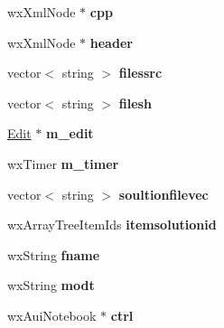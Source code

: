 \begin{DoxyCompactItemize}
\item 
\hypertarget{class_my_frame_a55fdc62db9cfaed55c9318a49a7e6d00}{wx\+Xml\+Node $\ast$ {\bfseries cpp}}\label{class_my_frame_a55fdc62db9cfaed55c9318a49a7e6d00}

\item 
\hypertarget{class_my_frame_a29d0500f3ac56fefc8754eb0f9655493}{wx\+Xml\+Node $\ast$ {\bfseries header}}\label{class_my_frame_a29d0500f3ac56fefc8754eb0f9655493}

\item 
\hypertarget{class_my_frame_a8219bad5739991ed403ad91e8e39b6da}{vector$<$ string $>$ {\bfseries filessrc}}\label{class_my_frame_a8219bad5739991ed403ad91e8e39b6da}

\item 
\hypertarget{class_my_frame_abe51d41c3d84769d73b644614e8b6dda}{vector$<$ string $>$ {\bfseries filesh}}\label{class_my_frame_abe51d41c3d84769d73b644614e8b6dda}

\item 
\hypertarget{class_my_frame_aad2347baa5785992e29c71072f7a4830}{\hyperlink{class_edit}{Edit} $\ast$ {\bfseries m\+\_\+edit}}\label{class_my_frame_aad2347baa5785992e29c71072f7a4830}

\item 
\hypertarget{class_my_frame_a487ae8aac4b7d05d5c943c3c2786b3c6}{wx\+Timer {\bfseries m\+\_\+timer}}\label{class_my_frame_a487ae8aac4b7d05d5c943c3c2786b3c6}

\item 
\hypertarget{class_my_frame_a0dd1da5220fb2ccde7c6e899a9ac9dce}{vector$<$ string $>$ {\bfseries soultionfilevec}}\label{class_my_frame_a0dd1da5220fb2ccde7c6e899a9ac9dce}

\item 
\hypertarget{class_my_frame_a5fabef1e36aeeff63246329a6f3a28c1}{wx\+Array\+Tree\+Item\+Ids {\bfseries itemsolutionid}}\label{class_my_frame_a5fabef1e36aeeff63246329a6f3a28c1}

\item 
\hypertarget{class_my_frame_aab3a8a461611c91fd0c0659e7c0a3dcd}{wx\+String {\bfseries fname}}\label{class_my_frame_aab3a8a461611c91fd0c0659e7c0a3dcd}

\item 
\hypertarget{class_my_frame_a63a7fedb7d8996df5cd2454365feea03}{wx\+String {\bfseries modt}}\label{class_my_frame_a63a7fedb7d8996df5cd2454365feea03}

\item 
\hypertarget{class_my_frame_a1025191d15a9aff70df9e77a159f7329}{wx\+Aui\+Notebook $\ast$ {\bfseries ctrl}}\label{class_my_frame_a1025191d15a9aff70df9e77a159f7329}


\end{DoxyCompactItemize}
